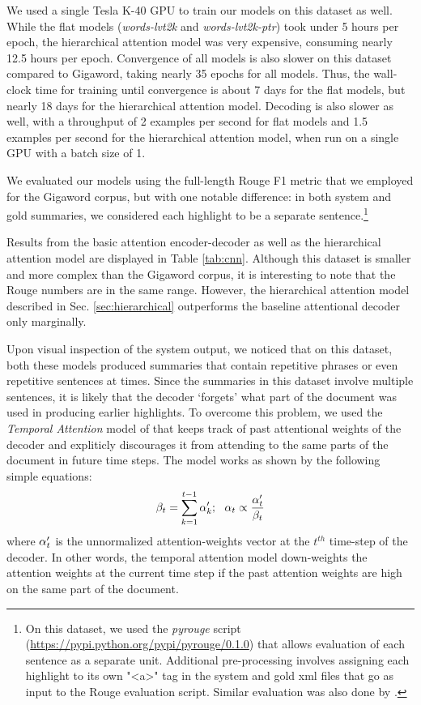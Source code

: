 \documentclass[11pt]{article}
\begin{document}
 We used a single Tesla K-40 GPU to train our models on this dataset as well. While the flat models ({\it words-lvt2k} and {\it words-lvt2k-ptr}) took under 5 hours per epoch, the hierarchical attention model was very expensive, consuming nearly 12.5 hours per epoch. Convergence of all models is also slower on this dataset compared to Gigaword, taking nearly 35 epochs for all models. Thus, the wall-clock time for training until convergence is about 7 days for the flat models, but nearly 18 days for the hierarchical attention model. Decoding is also slower as well, with a throughput of 2 examples per second for flat models and 1.5 examples per second for the hierarchical attention model, when run on a single GPU with a batch size of 1.

 We evaluated our models using the full-length Rouge F1 metric that we employed for the Gigaword corpus, but with one notable difference: in both system and gold summaries, we considered each highlight to be a separate sentence.\footnote{On this dataset, we used the {\it pyrouge} script (\url{https://pypi.python.org/pypi/pyrouge/0.1.0}) that allows evaluation of each sentence as a separate unit. Additional pre-processing involves assigning each highlight to its own "<a>" tag in the system and gold xml files that go as input to the Rouge evaluation script. Similar evaluation was also done by \cite{jianpeng}.}

 Results from the basic attention encoder-decoder as well as the hierarchical attention model are displayed in Table \ref{tab:cnn}. Although this dataset is smaller and more complex than the Gigaword corpus, it is interesting to note that the Rouge numbers are in the same range. However, the hierarchical attention model described in Sec. \ref{sec:hierarchical} outperforms  the baseline attentional decoder only marginally. 

Upon visual inspection of the system output, we noticed that on this dataset, both these models  produced summaries that contain repetitive phrases or even repetitive sentences at times. Since the summaries in this dataset involve multiple sentences, it is likely that the decoder `forgets' what part of the document was used in producing earlier highlights. To overcome this problem, we used the {\it Temporal Attention} model of  that keeps track of past attentional weights of the decoder and expliticly discourages it from attending to the same parts of the document in future time steps. The model works as shown by the following simple equations:
\begin{equation}
{\bf \beta}_t = \sum_{k=1}^{t-1}{\bf \alpha}_k';~~ {\bf \alpha}_t \propto \frac{{\bf \alpha}'_t}{{\bf \beta}_t} \nonumber
\end{equation}
where ${\bf \alpha}'_t$ is the unnormalized attention-weights vector at the $t^{th}$ time-step of the decoder. In other words, the temporal attention model down-weights the attention weights at the current time step if the past attention weights are high on the same part of the document. 
\end{document}
